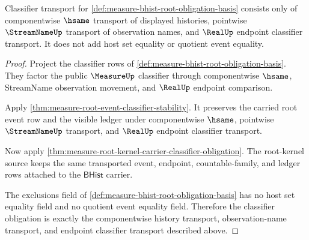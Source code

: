 \begin{theorem}
\label{thm:measure-bhist-root-classifier-obligation}
Classifier transport for
\autoref{def:measure-bhist-root-obligation-basis} consists only of
componentwise $\hsame$ transport of displayed histories, pointwise
$\StreamNameUp$ transport of observation names, and $\RealUp$ endpoint
classifier transport. It does not add host set equality or quotient event
equality.
\end{theorem}
\begin{proof}
Project the classifier rows of
\autoref{def:measure-bhist-root-obligation-basis}. They factor the public
$\MeasureUp$ classifier through componentwise $\hsame$, StreamName
observation movement, and $\RealUp$ endpoint comparison.

Apply \autoref{thm:measure-root-event-classifier-stability}. It preserves the
carried root event row and the visible ledger under componentwise $\hsame$,
pointwise $\StreamNameUp$ transport, and $\RealUp$ endpoint classifier
transport.

Now apply \autoref{thm:measure-root-kernel-carrier-classifier-obligation}.
The root-kernel source keeps the same transported event, endpoint,
countable-family, and ledger rows attached to the $\mathsf{BHist}$ carrier.

The exclusions field of
\autoref{def:measure-bhist-root-obligation-basis} has no host set equality
field and no quotient event equality field. Therefore the classifier
obligation is exactly the componentwise history transport, observation-name
transport, and endpoint classifier transport described above.
\end{proof}

